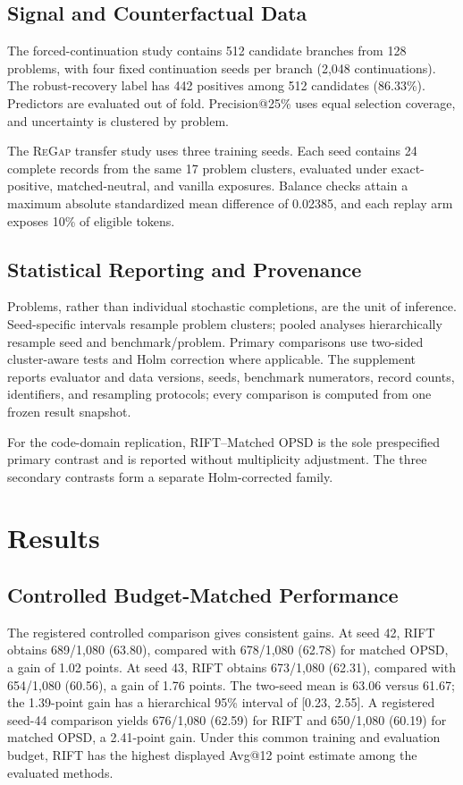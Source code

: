 \documentclass[letterpaper]{article}
\newcommand{\RIFT}{\textsc{RIFT}}
\newcommand{\ReGap}{\textsc{ReGap}}
\begin{document}
\subsection{Signal and Counterfactual Data}

The forced-continuation study contains 512 candidate branches from 128
problems, with four fixed continuation seeds per branch (2,048 continuations).
The robust-recovery label has 442 positives among 512 candidates (86.33\%).
Predictors are evaluated out of fold. Precision@25\% uses equal selection
coverage, and uncertainty is clustered by problem.

The \ReGap{} transfer study uses three training seeds. Each seed contains 24
complete records from the same 17 problem clusters, evaluated under
exact-positive, matched-neutral, and vanilla exposures. Balance checks attain a
maximum absolute standardized mean difference of 0.02385, and each replay arm
exposes 10\% of eligible tokens.

\subsection{Statistical Reporting and Provenance}

Problems, rather than individual stochastic completions, are the unit of
inference. Seed-specific intervals resample problem clusters; pooled analyses
hierarchically resample seed and benchmark/problem. Primary comparisons use
two-sided cluster-aware tests and Holm correction where applicable. The
supplement reports evaluator and data versions, seeds, benchmark numerators,
record counts, identifiers, and resampling protocols; every comparison is
computed from one frozen result snapshot.

For the code-domain replication, \RIFT{}--Matched OPSD is the sole
prespecified primary contrast and is reported without multiplicity adjustment.
The three secondary contrasts form a separate Holm-corrected family.

\section{Results}

\subsection{Controlled Budget-Matched Performance}

The registered controlled comparison gives consistent gains. At seed 42,
\RIFT{} obtains 689/1,080 (63.80), compared with 678/1,080 (62.78)
for matched OPSD, a gain of 1.02 points. At seed 43, \RIFT{} obtains 673/1,080
(62.31), compared with 654/1,080 (60.56), a gain of 1.76 points. The two-seed
mean is 63.06 versus 61.67; the 1.39-point gain has a hierarchical 95\%
interval of [0.23, 2.55]. A registered seed-44 comparison yields 676/1,080
(62.59) for \RIFT{} and 650/1,080 (60.19) for matched OPSD, a 2.41-point
gain. Under this common training and evaluation budget, \RIFT{} has the
highest displayed Avg@12 point estimate among the evaluated methods.
\end{document}
